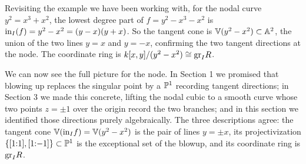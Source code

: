 \documentclass[12pt]{amsproc}
\begin{document}
Revisiting the example we have been working with, for the nodal curve $y^2 = x^3 + x^2$, the lowest degree part of  $f = y^2 - x^3 - x^2$ is $\init_I(f) = y^2 - x^2 = (y-x)(y+x)$. So the tangent cone is $\V(y^2 - x^2) \subset \A^2$, the union of the two lines $y = x$ and $y = -x$, confirming the two tangent directions at the node. The coordinate ring is $k[x,y]/(y^2 - x^2) \cong \gr_I R$.

We can now see the full picture for the node. In Section 1 we promised that  blowing up replaces the singular point by a $\P^1$ recording tangent directions; in Section 3 we made this concrete, lifting the nodal cubic to a smooth curve whose two points $z = \pm 1$ over the origin record the two 
branches; and in this section we identified those directions purely algebraically. The three descriptions agree: the tangent cone 
$\V(\init_I f) = \V(y^2 - x^2)$ is the pair of lines $y = \pm x$, its projectivization $\{[1{:}1], [1{:}{-}1]\} \subset \P^1$ is the exceptional set of the blowup, and its coordinate ring is $\gr_I R$.
\par\noindent\ignorespaces
\clearpage

\newpage 






\end{document}

